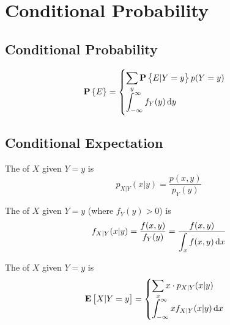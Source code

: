 \chapter{Conditional Probability}

\section{Conditional Probability}

\begin{theorem}
    \begin{equation}
        \probability{E} = \begin{cases}
            \displaystyle \sum_y \probability{E|Y = y} p(Y=y) \\
            \displaystyle \int_{-\infty}^\infty f_Y(y) \dif{y}
        \end{cases}
    \end{equation}    
\end{theorem}


\section{Conditional Expectation}

\begin{definition}
    The  of $X$ given $Y=y$ is 
    \begin{equation}
        p_{X|Y}(x|y) = \dfrac{p(x,y)}{p_Y (y)}
    \end{equation}
    
    The  of $X$ given $Y=y$ (where $f_Y (y) > 0$) is 
    \begin{equation}
        f_{X|Y}(x|y) = \dfrac{f(x,y)}{f_Y (y)} = \dfrac{f(x,y)}{\displaystyle \int_x f(x,y) \dif{x}}
    \end{equation}
\end{definition}





\begin{definition}
    The  of $X$ given $Y=y$ is 
    \begin{equation}
        \displaystyle \expect{X|Y=y} = \begin{cases}
            \displaystyle \sum_x x \cdot p_{X|Y}(x|y) \\
            \displaystyle \int_{-\infty}^\infty x f_{X|Y} (x|y) \dif{x}
        \end{cases} 
    \end{equation}
\end{definition}

